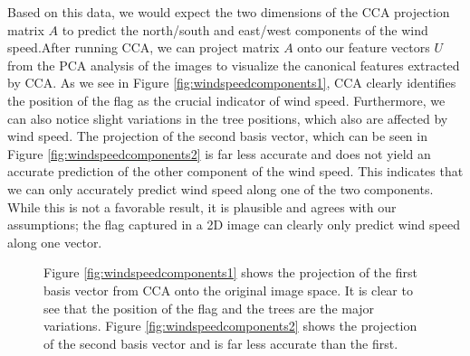 Based on this data, we would expect the two dimensions of the CCA projection matrix $A$ to predict the north/south and east/west components of the wind speed.After running CCA, we can project matrix $A$ onto our feature vectors $U$ from the PCA analysis of the images to visualize the canonical features extracted by CCA. As we see in Figure \ref{fig:windspeedcomponents1}, CCA clearly identifies the position of the flag as the crucial indicator of wind speed. Furthermore, we can also notice slight variations in the tree positions, which also are affected by wind speed. The projection of the second basis vector, which can be seen in Figure \ref{fig:windspeedcomponents2} is far less accurate and does not yield an accurate prediction of the other component of the wind speed. This indicates that we can only accurately predict wind speed along one of the two components. While this is not a favorable result, it is plausible and agrees with our assumptions; the flag captured in a 2D image can clearly only predict wind speed along one vector. 
\begin{figure}
	\centering
		\caption{Figure \ref{fig:windspeedcomponents1} shows the projection of the first basis vector from CCA onto the original image space. It is clear to see that the position of the flag and the trees are the major variations. Figure \ref{fig:windspeedcomponents2} shows the projection of the second basis vector and is far less accurate than the first.}
\end{figure}

